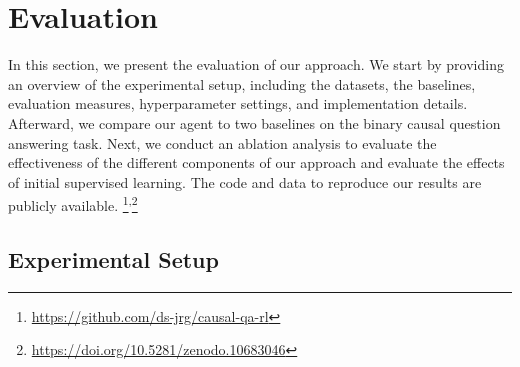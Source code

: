 \section{Evaluation}
\label{sec:evaluation}

In this section, we present the evaluation of our approach. We start by providing an overview of the experimental setup, including the datasets, the baselines, evaluation measures, hyperparameter settings, and implementation details. Afterward, we compare our agent to two baselines on the binary causal question answering task. Next, we conduct an ablation analysis to evaluate the effectiveness of the different components of our approach and evaluate the effects of initial supervised learning. The code and data to reproduce our results are publicly available.%
\footnote{\url{https://github.com/ds-jrg/causal-qa-rl}}\textsuperscript{,}\footnote{\url{https://doi.org/10.5281/zenodo.10683046}}




\subsection{Experimental Setup}
\label{subsec:experimental-setup}
